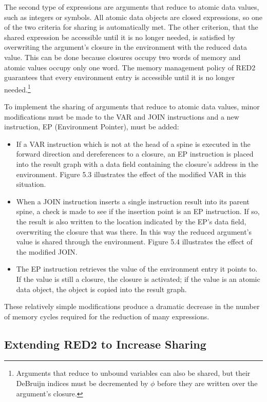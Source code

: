 The second type of expressions are arguments that reduce to atomic data values,
such as integers or symbols. All atomic data objects are closed expressions, so
one of the two criteria for sharing is automatically met. The other criterion,
that the shared expression be accessible until it is no longer needed, is
satisfied by overwriting the argument's closure in the environment with the
reduced data value. This can be done because closures occupy two words of memory
and atomic values occupy only one word. The memory management policy of RED2
guarantees that every environment entry is accessible until it is no longer
needed.\footnote{Arguments that reduce to unbound variables can also be
shared, but their DeBruijn indices must be decremented by \(\phi\) before they
are written over the argument's closure.}

To implement the sharing of arguments that reduce to atomic data values, minor
modifications must be made to the VAR and JOIN instructions and a new
instruction, EP (Environment Pointer), must be added:

\begin{itemize}
\item If a VAR instruction which is not at the head of a spine is executed in
the forward direction and dereferences to a closure, an EP instruction is placed
into the result graph with a data field containing the closure's address in the
environment. Figure 5.3 illustrates the effect of the modified VAR in this
situation.
\item When a JOIN instruction inserts a single instruction result into its
parent spine, a check is made to see if the insertion point is an EP
instruction. If so, the result is also written to the location indicated by the
EP's data field, overwriting the closure that was there. In this way the reduced
argument's value is shared through the environment. Figure 5.4 illustrates the
effect of the modified JOIN.
\item The EP instruction retrieves the value of the environment entry it points
to. If the value is still a closure, the closure is activated; if the value is
an atomic data object, the object is copied into the result graph.
\end{itemize}

These relatively simple modifications produce a dramatic decrease in the number
of memory cycles required for the reduction of many expressions.

\subsection{Extending RED2 to Increase Sharing}


